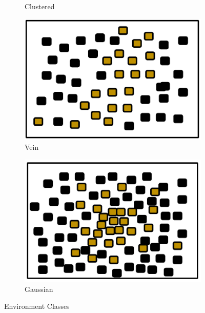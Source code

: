 \begin{figure} [h]
\begin{subfigure}[b]{0.205\textwidth}
                \caption{Clustered}
                \label{fig:clusterenv}
        \end{subfigure}
        \begin{subfigure}[b]{0.2\textwidth}
                \includegraphics[width=\textwidth]{chapters/chapter4/figures/veinenv.pdf}
                \caption{Vein}
                \label{fig:veinenv}
        \end{subfigure}  
        \begin{subfigure}[b]{0.2\textwidth}
                        \includegraphics[width=\textwidth]{chapters/chapter4/figures/gaussianenv}
                        \caption{Gaussian}
                        \label{fig:gaussianenv}
       \end{subfigure}
        \caption{Environment Classes}\label{fig:environments}
\end{figure}


